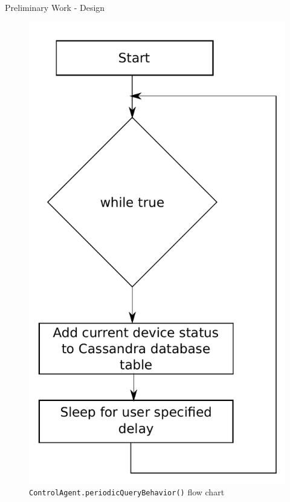 \documentclass{beamer}
\begin{document}
\begin{frame}{Preliminary Work - Design}{}
    \begin{figure}
        \centering
        \includegraphics[scale=0.3]{figs/periodicQueryBehaviorFlow.pdf}
        \caption{\texttt{ControlAgent.periodicQueryBehavior()} flow chart}
        \label{fig:periodicQueryBehavior}
    \end{figure}
\end{frame}
\end{document}
